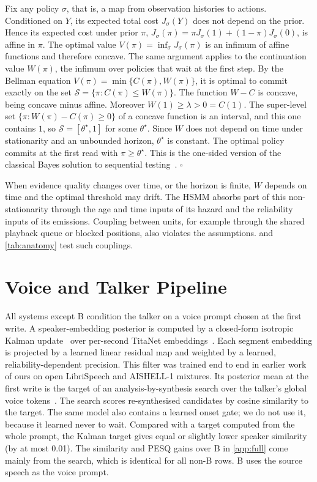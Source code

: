 Fix any policy $\sigma$, that is, a map from observation histories to actions.
Conditioned on $Y$, its expected total cost $J_\sigma(Y)$ does not depend on the prior.
Hence its expected cost under prior $\pi$, $J_\sigma(\pi) = \pi J_\sigma(1) + (1-\pi) J_\sigma(0)$, is affine in $\pi$.
The optimal value $V(\pi) = \inf_\sigma J_\sigma(\pi)$ is an infimum of affine functions and therefore concave.
The same argument applies to the continuation value $W(\pi)$, the infimum over policies that wait at the first step.
By the Bellman equation $V(\pi) = \min\{C(\pi), W(\pi)\}$, it is optimal to commit exactly on the set $\mathcal{S} = \{\pi : C(\pi) \le W(\pi)\}$.
The function $W - C$ is concave, being concave minus affine.
Moreover $W(1) \ge \lambda > 0 = C(1)$.
The super-level set $\{\pi : W(\pi) - C(\pi) \ge 0\}$ of a concave function is an interval, and this one contains $1$, so $\mathcal{S} = [\theta^\star, 1]$ for some $\theta^\star$.
Since $W$ does not depend on time under stationarity and an unbounded horizon, $\theta^\star$ is constant.
The optimal policy commits at the first read with $\pi \ge \theta^\star$.
This is the one-sided version of the classical Bayes solution to sequential testing~\citep{wald1948optimum,degroot1970optimal,shiryaev1978optimal}. \hfill$\square$

When evidence quality changes over time, or the horizon is finite, $W$ depends on time and the optimal threshold may drift.
The HSMM absorbs part of this non-stationarity through the age and time inputs of its hazard and the reliability inputs of its emissions.
Coupling between units, for example through the shared playback queue or blocked positions, also violates the assumptions.
 and \cref{tab:anatomy} test such couplings.

\section{Voice and Talker Pipeline}
\label{app:voice}

All systems except B condition the talker on a voice prompt chosen at the first write.
A speaker-embedding posterior is computed by a closed-form isotropic Kalman update~\citep{kalman1960new} over per-second TitaNet embeddings~\citep{koluguri2022titanet}.
Each segment embedding is projected by a learned linear residual map and weighted by a learned, reliability-dependent precision.
This filter was trained end to end in earlier work of ours on open LibriSpeech and AISHELL-1 mixtures.
Its posterior mean at the first write is the target of an analysis-by-synthesis search over the talker's global voice tokens~\citep{wang2025spark}.
The search scores re-synthesised candidates by cosine similarity to the target.
The same model also contains a learned onset gate; we do not use it, because it learned never to wait.
Compared with a target computed from the whole prompt, the Kalman target gives equal or slightly lower speaker similarity (by at most 0.01).
The similarity and PESQ gains over B in \cref{app:full} come mainly from the search, which is identical for all non-B rows.
B uses the source speech as the voice prompt.

